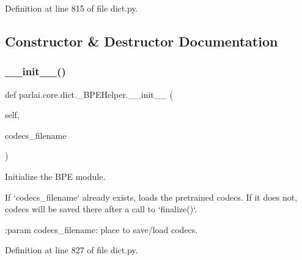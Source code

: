 Definition at line 815 of file dict.\+py.



\subsection{Constructor \& Destructor Documentation}
\mbox{\label{classparlai_1_1core_1_1dict_1_1__BPEHelper_a449da91d98a6bb75bc374782cf9f7016}} 
\subsubsection{\texorpdfstring{\+\_\+\+\_\+init\+\_\+\+\_\+()}{\_\_init\_\_()}}
{\footnotesize\ttfamily def parlai.\+core.\+dict.\+\_\+\+B\+P\+E\+Helper.\+\_\+\+\_\+init\+\_\+\+\_\+ (\begin{DoxyParamCaption}\item[{}]{self,  }\item[{}]{codecs\+\_\+filename }\end{DoxyParamCaption})}

\begin{DoxyVerb}Initialize the BPE module.

If `codecs_filename` already exists, loads the pretrained codecs.
If it does not, codecs will be saved there after a call to `finalize()`.

:param codecs_filename:
    place to save/load codecs.
\end{DoxyVerb}
 

Definition at line 827 of file dict.\+py.


